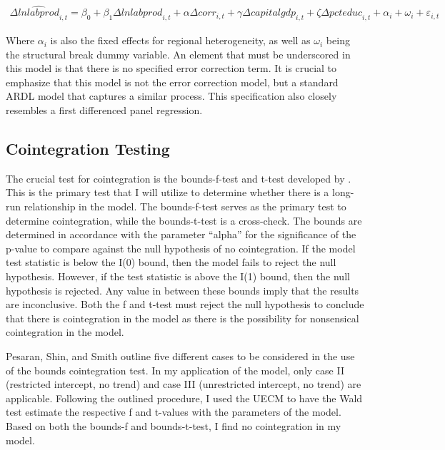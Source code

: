 \documentclass[12pt]{article} %
\begin{document}
\begin{equation} \label{eu_eqn}
	\begin{aligned}
		\Delta\widehat{lnlabprod}_{i,t} = \beta_{0}+\beta_{1}\Delta{lnlabprod}_{i,t} +\alpha\Delta{corr}_{i,t} + \gamma\Delta{capitalgdp}_{i,t}+ \zeta\Delta{pcteduc}_{i,t} +
		\alpha_{i} +  \omega_{i} + \varepsilon_{i,t}
	\end{aligned}
\end{equation}

Where $\alpha_{i}$ is also the fixed effects for regional heterogeneity, as well as $\omega_{i}$ being the structural break dummy variable. An element that must be underscored in this model is that there is no specified error correction term. It is crucial to emphasize that this model is not the error correction model, but a standard ARDL model that captures a similar process. This specification also closely resembles a first differenced panel regression. 


\subsection*{Cointegration Testing}

The crucial test for cointegration is the bounds-f-test and t-test developed by \citet{pesaran_bounds_2001}. This is the primary test that I will utilize to determine whether there is a long-run relationship in the model. The bounds-f-test serves as the primary test to determine cointegration, while the bounds-t-test is a cross-check. The bounds are determined in accordance with the parameter “alpha” for the significance of the p-value to compare against the null hypothesis of no cointegration. If the model test statistic is below the I(0) bound, then the model fails to reject the null hypothesis. However, if the test statistic is above the I(1) bound, then the null hypothesis is rejected. Any value in between these bounds imply that the results are inconclusive. Both the f and t-test must reject the null hypothesis to conclude that there is cointegration in the model as there is the possibility for nonsensical cointegration in the model.  

Pesaran, Shin, and Smith outline five different cases to be considered in the use of the bounds cointegration test. In my application of the model, only case II (restricted intercept, no trend) and case III (unrestricted intercept, no trend) are applicable. Following the outlined procedure, I used the UECM to have the Wald test estimate the respective f and t-values with the parameters of the model. Based on both the bounds-f and bounds-t-test, I find no cointegration in my model. 
\end{document}
